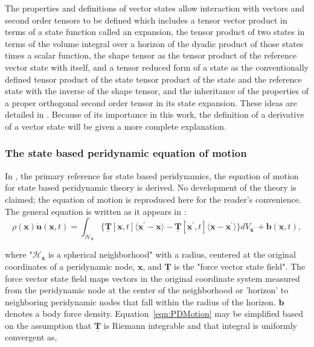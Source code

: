 \documentclass[preprint,12pt]{elsarticle}
\begin{document}
%
The properties and definitions of vector states allow interaction with vectors
and second order tensors to be defined which includes a tensor vector product
in terms of a state function called an expansion, the tensor product of two states in terms of the
volume integral over a horizon of the dyadic product of those states times a
scalar function, the shape tensor as the tensor product of the reference vector
state with itself, and a tensor reduced form of a state as the conventionally
defined tensor product of the state tensor product of the state and the
reference state with the inverse of the shape tensor, and the inheritance of
the properties of a proper orthogonal second order tensor in its state
expansion. These ideas are detailed in \cite{silling:psa}. 
%
Because of its importance in this work, the definition of a derivative of a vector state
will be given a more complete explanation.



\subsubsection{The state based peridynamic equation of motion}

In \cite{silling:psa}, the primary reference for state based peridynamics, the
equation of motion for state based peridynamic theory is derived. No
development of the theory is claimed; the equation of motion is reproduced here for the reader's convenience.
%
The general equation is written as it appears in \cite{silling:psa}:
\begin{equation} 
    \label{eqn:PDMotion}
    \rho(\boldsymbol{x})\boldsymbol{\ddot{u}}(\boldsymbol{x}, t) = \int_{\mathcal{H}_{\boldsymbol{x}}} \{\boldsymbol{\underline{T}}[\boldsymbol{x}, t]\langle \boldsymbol{x}^{\prime} - \boldsymbol{x} \rangle - \boldsymbol{\underline{T}}[\boldsymbol{x}^{\prime}, t]\langle \boldsymbol{x} - \boldsymbol{x}^{\prime} \rangle \}dV_{\boldsymbol{x}^{\prime}} + \boldsymbol{b}(\boldsymbol{x}, t),
\end{equation} 

where "$\mathcal{H}_{\boldsymbol{x}}$ is a spherical neighborhood" with a
radius, centered at the original coordinates of a peridynamic node,
$\boldsymbol{x}$, and $\boldsymbol{\underline{T}}$ is the "force vector state
field". The force vector state field maps vectors in the original coordinate system 
measured from the peridynamic node at the center of the neighborhood or 'horizon' to
neighboring peridynamic nodes that fall within the radius of the horizon. $\boldsymbol{b}$ denotes a body force density. Equation~\ref{eqn:PDMotion} may be simplified based on the assumption that
$\boldsymbol{\underline{T}}$ is Riemann integrable and that integral is uniformly
convergent \cite{silling:psa} as,
\end{document}
